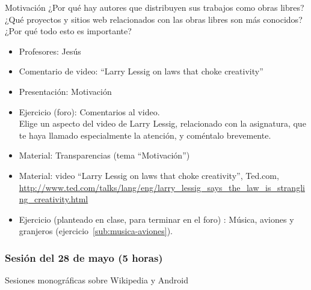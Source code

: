 \documentclass[a4paper,12pt]{article}
\begin{document}
Motivación ¿Por qué hay autores que distribuyen sus trabajos como obras libres? ¿Qué proyectos y sitios web relacionados con las obras libres son más conocidos? ¿Por qué todo esto es importante?

\begin{itemize}
\item Profesores: Jesús
\item Comentario de video: ``Larry Lessig on laws that choke creativity''
\item Presentación: Motivación
\item Ejercicio (foro): Comentarios al video. \\
  Elige un aspecto del video de Larry Lessig, relacionado con la asignatura, que te haya llamado especialmente la atención, y coméntalo brevemente.
\item Material: Transparencias (tema ``Motivación'')
\item Material: video ``Larry Lessig on laws that choke creativity'', Ted.com, \\
  \url{http://www.ted.com/talks/lang/eng/larry_lessig_says_the_law_is_strangling_creativity.html}
\item Ejercicio (planteado en clase, para terminar en el foro) : Música, aviones y granjeros (ejercicio~\ref{sub:musica-aviones}).

 \end{itemize}

\subsubsection{Sesión del 28 de mayo (5 horas)}
\label{sec:sesion-del-28}

Sesiones monográficas sobre Wikipedia y Android

\end{document}
